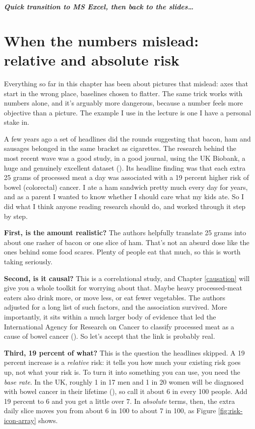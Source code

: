 \documentclass[
]{book}
\begin{document}
\textbf{\emph{Quick transition to MS Excel, then back to the slides\ldots{}}}

\section{When the numbers mislead: relative and absolute risk}\label{risk}

Everything so far in this chapter has been about pictures that mislead: axes that start in the wrong place, baselines chosen to flatter. The same trick works with numbers alone, and it's arguably more dangerous, because a number feels more objective than a picture. The example I use in the lecture is one I have a personal stake in.

A few years ago a set of headlines did the rounds suggesting that bacon, ham and sausages belonged in the same bracket as cigarettes. The research behind the most recent wave was a good study, in a good journal, using the UK Biobank, a huge and genuinely excellent dataset (). Its headline finding was that each extra 25 grams of processed meat a day was associated with a 19 percent higher risk of bowel (colorectal) cancer. I ate a ham sandwich pretty much every day for years, and as a parent I wanted to know whether I should care what my kids ate. So I did what I think anyone reading research should do, and worked through it step by step.

\textbf{First, is the amount realistic?} The authors helpfully translate 25 grams into about one rasher of bacon or one slice of ham. That's not an absurd dose like the ones behind some food scares. Plenty of people eat that much, so this is worth taking seriously.

\textbf{Second, is it causal?} This is a correlational study, and Chapter \ref{causation} will give you a whole toolkit for worrying about that. Maybe heavy processed-meat eaters also drink more, or move less, or eat fewer vegetables. The authors adjusted for a long list of such factors, and the association survived. More importantly, it sits within a much larger body of evidence that led the International Agency for Research on Cancer to classify processed meat as a cause of bowel cancer (). So let's accept that the link is probably real.

\textbf{Third, 19 percent of what?} This is the question the headlines skipped. A 19 percent increase is a \emph{relative} risk: it tells you how much your existing risk goes up, not what your risk is. To turn it into something you can use, you need the \emph{base rate}. In the UK, roughly 1 in 17 men and 1 in 20 women will be diagnosed with bowel cancer in their lifetime (), so call it about 6 in every 100 people. Add 19 percent to 6 and you get a little over 7. In \emph{absolute} terms, then, the extra daily slice moves you from about 6 in 100 to about 7 in 100, as Figure \ref{fig:risk-icon-array} shows.
\end{document}
